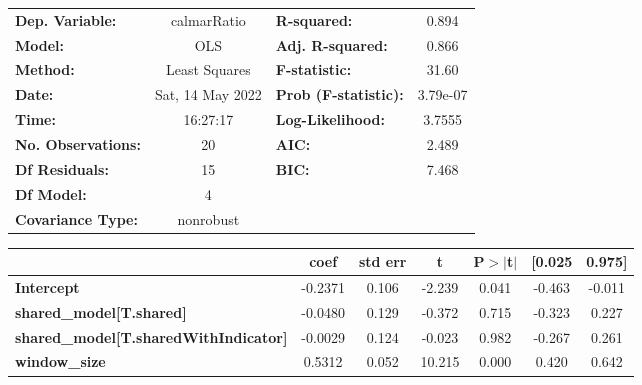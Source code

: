 \begin{center}
\begin{tabular}{lclc}
\toprule
\textbf{Dep. Variable:}                       &   calmarRatio    & \textbf{  R-squared:         } &     0.894   \\
\textbf{Model:}                               &       OLS        & \textbf{  Adj. R-squared:    } &     0.866   \\
\textbf{Method:}                              &  Least Squares   & \textbf{  F-statistic:       } &     31.60   \\
\textbf{Date:}                                & Sat, 14 May 2022 & \textbf{  Prob (F-statistic):} &  3.79e-07   \\
\textbf{Time:}                                &     16:27:17     & \textbf{  Log-Likelihood:    } &    3.7555   \\
\textbf{No. Observations:}                    &          20      & \textbf{  AIC:               } &     2.489   \\
\textbf{Df Residuals:}                        &          15      & \textbf{  BIC:               } &     7.468   \\
\textbf{Df Model:}                            &           4      & \textbf{                     } &             \\
\textbf{Covariance Type:}                     &    nonrobust     & \textbf{                     } &             \\
\bottomrule
\end{tabular}
\begin{tabular}{lcccccc}
                                              & \textbf{coef} & \textbf{std err} & \textbf{t} & \textbf{P$> |$t$|$} & \textbf{[0.025} & \textbf{0.975]}  \\
\midrule
\textbf{Intercept}                            &      -0.2371  &        0.106     &    -2.239  &         0.041        &       -0.463    &       -0.011     \\
\textbf{shared\_model[T.shared]}              &      -0.0480  &        0.129     &    -0.372  &         0.715        &       -0.323    &        0.227     \\
\textbf{shared\_model[T.sharedWithIndicator]} &      -0.0029  &        0.124     &    -0.023  &         0.982        &       -0.267    &        0.261     \\
\textbf{window\_size}                         &       0.5312  &        0.052     &    10.215  &         0.000        &        0.420    &        0.642     \\

\end{tabular}
\end{center}
